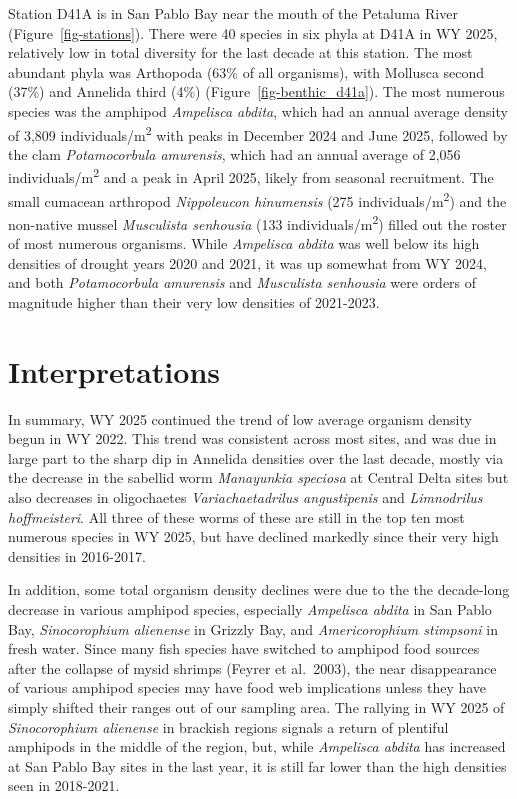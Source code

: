 \documentclass[
  letterpaper,
]{article}
\begin{document}
Station D41A is in San Pablo Bay near the mouth of the Petaluma River
(Figure~\ref{fig-stations}). There were 40 species in six phyla at D41A
in WY 2025, relatively low in total diversity for the last decade at
this station. The most abundant phyla was Arthopoda (63\% of all
organisms), with Mollusca second (37\%) and Annelida third (4\%)
(Figure~\ref{fig-benthic_d41a}). The most numerous species was the
amphipod \emph{Ampelisca abdita}, which had an annual average density of
3,809 individuals/m\textsuperscript{2} with peaks in December 2024 and
June 2025, followed by the clam \emph{Potamocorbula amurensis}, which
had an annual average of 2,056 individuals/m\textsuperscript{2} and a
peak in April 2025, likely from seasonal recruitment. The small cumacean
arthropod \emph{Nippoleucon hinumensis} (275
individuals/m\textsuperscript{2}) and the non-native mussel
\emph{Musculista senhousia} (133 individuals/m\textsuperscript{2})
filled out the roster of most numerous organisms. While \emph{Ampelisca
abdita} was well below its high densities of drought years 2020 and
2021, it was up somewhat from WY 2024, and both \emph{Potamocorbula
amurensis} and \emph{Musculista senhousia} were orders of magnitude
higher than their very low densities of 2021-2023.

\section{Interpretations}\label{interpretations}

In summary, WY 2025 continued the trend of low average organism density
begun in WY 2022. This trend was consistent across most sites, and was
due in large part to the sharp dip in Annelida densities over the last
decade, mostly via the decrease in the sabellid worm \emph{Manayunkia
speciosa} at Central Delta sites but also decreases in oligochaetes
\emph{Variachaetadrilus angustipenis} and \emph{Limnodrilus
hoffmeisteri}. All three of these worms of these are still in the top
ten most numerous species in WY 2025, but have declined markedly since
their very high densities in 2016-2017.

In addition, some total organism density declines were due to the the
decade-long decrease in various amphipod species, especially
\emph{Ampelisca abdita} in San Pablo Bay, \emph{Sinocorophium alienense}
in Grizzly Bay, and \emph{Americorophium stimpsoni} in fresh water.
Since many fish species have switched to amphipod food sources after the
collapse of mysid shrimps (Feyrer et al.~2003), the near disappearance
of various amphipod species may have food web implications unless they
have simply shifted their ranges out of our sampling area. The rallying
in WY 2025 of \emph{Sinocorophium alienense} in brackish regions signals
a return of plentiful amphipods in the middle of the region, but, while
\emph{Ampelisca abdita} has increased at San Pablo Bay sites in the last
year, it is still far lower than the high densities seen in 2018-2021.
\end{document}
